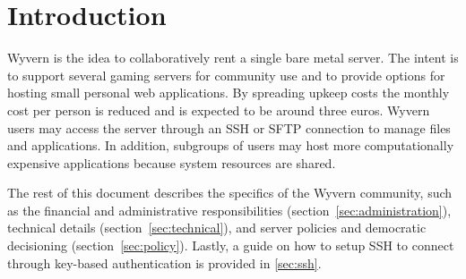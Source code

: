 \section{Introduction}
Wyvern is the idea to collaboratively rent a single bare metal server. The intent is to support several gaming servers for community use and to provide options for hosting small personal web applications. By spreading upkeep costs the monthly cost per person is reduced and is expected to be around three euros. Wyvern users may access the server through an SSH or SFTP connection to manage files and applications. In addition, subgroups of users may host more computationally expensive applications because system resources are shared.

The rest of this document describes the specifics of the Wyvern community, such as the financial and administrative responsibilities (section~\ref{sec:administration}), technical details (section~\ref{sec:technical}), and server policies and democratic decisioning (section~\ref{sec:policy}). Lastly, a guide on how to setup SSH to connect through key-based authentication is provided in \ref{sec:ssh}.
